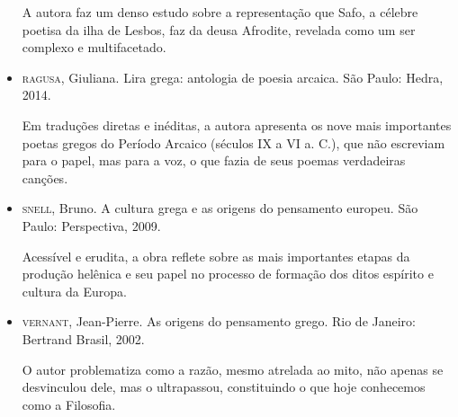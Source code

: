 \documentclass[12pt]{extarticle}
\begin{document}
\begin{itemize}
A autora faz um denso estudo sobre a representação que Safo, a célebre
poetisa da ilha de Lesbos, faz da deusa Afrodite, revelada como um ser
complexo e multifacetado.

\item \textsc{ragusa}, Giuliana. Lira grega: antologia de poesia arcaica. São
Paulo: Hedra, 2014.

Em traduções diretas e inéditas, a autora apresenta os nove mais
importantes poetas gregos do Período Arcaico (séculos IX a VI a. C.),
que não escreviam para o papel, mas para a voz, o que fazia de seus
poemas verdadeiras canções.

\item \textsc{snell}, Bruno. A cultura grega e as origens do pensamento
europeu. São Paulo: Perspectiva, 2009.

Acessível e erudita, a obra reflete sobre as mais importantes etapas da
produção helênica e seu papel no processo de formação dos ditos espírito
e cultura da Europa.

\item \textsc{vernant}, Jean-Pierre. As origens do pensamento grego. Rio de
Janeiro: Bertrand Brasil, 2002.

O autor problematiza como a razão, mesmo atrelada ao mito, não apenas se
desvinculou dele, mas o ultrapassou, constituindo o que hoje conhecemos
como a Filosofia.
\end{itemize}
\end{document}
